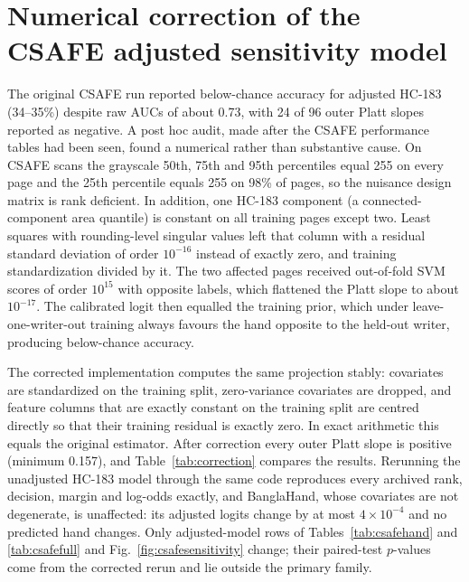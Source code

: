 \documentclass[10pt,a4paper]{article}
\begin{document}
\FloatBarrier
\section{Numerical correction of the CSAFE adjusted sensitivity model}
\label{sec:supcorrection}
The original CSAFE run reported below-chance accuracy for adjusted HC-183 (34--35\%) despite raw AUCs of about 0.73, with 24 of 96 outer Platt slopes reported as negative. A post hoc audit, made after the CSAFE performance tables had been seen, found a numerical rather than substantive cause. On CSAFE scans the grayscale 50th, 75th and 95th percentiles equal 255 on every page and the 25th percentile equals 255 on 98\% of pages, so the nuisance design matrix is rank deficient. In addition, one HC-183 component (a connected-component area quantile) is constant on all training pages except two. Least squares with rounding-level singular values left that column with a residual standard deviation of order $10^{-16}$ instead of exactly zero, and training standardization divided by it. The two affected pages received out-of-fold SVM scores of order $10^{15}$ with opposite labels, which flattened the Platt slope to about $10^{-17}$. The calibrated logit then equalled the training prior, which under leave-one-writer-out training always favours the hand opposite to the held-out writer, producing below-chance accuracy.

The corrected implementation computes the same projection stably: covariates are standardized on the training split, zero-variance covariates are dropped, and feature columns that are exactly constant on the training split are centred directly so that their training residual is exactly zero. In exact arithmetic this equals the original estimator. After correction every outer Platt slope is positive (minimum 0.157), and Table~\ref{tab:correction} compares the results. Rerunning the unadjusted HC-183 model through the same code reproduces every archived rank, decision, margin and log-odds exactly, and BanglaHand, whose covariates are not degenerate, is unaffected: its adjusted logits change by at most $4\times10^{-4}$ and no predicted hand changes. Only adjusted-model rows of Tables~\ref{tab:csafehand} and \ref{tab:csafefull} and Fig.~\ref{fig:csafesensitivity} change; their paired-test $p$-values come from the corrected rerun and lie outside the primary family.
\end{document}
